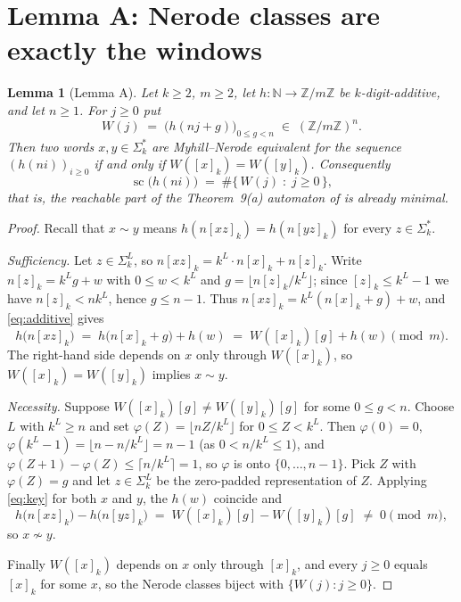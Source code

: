 \documentclass[10pt,reqno]{amsart}
\theoremstyle{plain}
\newtheorem{lemma}[theorem]{Lemma}
\theoremstyle{definition}
\theoremstyle{remark}
\numberwithin{theorem}{section}
\DeclareMathOperator{\sco}{sc}
\newcommand{\Zm}{\mathbb{Z}/m\mathbb{Z}}
\newcommand{\N}{\mathbb{N}}
\newcommand{\Sig}{\Sigma_k}
\begin{document}
\section{Lemma A: Nerode classes are exactly the windows}
\label{sec:lemA}

\begin{lemma}[Lemma A]
\label{lemA}
Let $k \ge 2$, $m \ge 2$, let $h : \N \to \Zm$ be $k$-digit-additive, and let $n \ge 1$.
For $j \ge 0$ put
\[
  W(j) \;=\; \bigl(h(nj + g)\bigr)_{0 \le g < n} \;\in\; (\Zm)^n .
\]
Then two words $x,y \in \Sig^*$ are Myhill--Nerode equivalent for the sequence
$(h(ni))_{i \ge 0}$ if and only if $W([x]_k) = W([y]_k)$. Consequently
\[
  \sco\bigl(h(ni)\bigr) \;=\; \#\{\,W(j) \;:\; j \ge 0\,\},
\]
that is, the reachable part of the Theorem~9(a) automaton of \cite{MRS} is already minimal.
\end{lemma}

\begin{proof}
Recall that $x \sim y$ means $h(n[xz]_k) = h(n[yz]_k)$ for every $z \in \Sig^*$.

\emph{Sufficiency.} Let $z \in \Sig^L$, so $n[xz]_k = k^L \cdot n[x]_k + n[z]_k$. Write
$n[z]_k = k^L g + w$ with $0 \le w < k^L$ and $g = \lfloor n[z]_k / k^L \rfloor$; since
$[z]_k \le k^L - 1$ we have $n[z]_k < nk^L$, hence $g \le n-1$. Thus
$n[xz]_k = k^L(n[x]_k + g) + w$, and \eqref{eq:additive} gives
\begin{equation}
  h\bigl(n[xz]_k\bigr) \;=\; h\bigl(n[x]_k + g\bigr) + h(w)
  \;=\; W([x]_k)[g] + h(w) \pmod m .
  \label{eq:key}
\end{equation}
The right-hand side depends on $x$ only through $W([x]_k)$, so $W([x]_k) = W([y]_k)$
implies $x \sim y$.

\emph{Necessity.} Suppose $W([x]_k)[g] \ne W([y]_k)[g]$ for some $0 \le g < n$. Choose $L$
with $k^L \ge n$ and set $\varphi(Z) = \lfloor nZ/k^L \rfloor$ for $0 \le Z < k^L$. Then
$\varphi(0) = 0$, $\varphi(k^L-1) = \lfloor n - n/k^L \rfloor = n-1$ (as $0 < n/k^L \le 1$),
and $\varphi(Z+1) - \varphi(Z) \le \lceil n/k^L \rceil = 1$, so $\varphi$ is onto
$\{0,\dots,n-1\}$. Pick $Z$ with $\varphi(Z) = g$ and let $z \in \Sig^L$ be the zero-padded
representation of $Z$. Applying \eqref{eq:key} for both $x$ and $y$, the $h(w)$ coincide and
\[
  h\bigl(n[xz]_k\bigr) - h\bigl(n[yz]_k\bigr) \;=\; W([x]_k)[g] - W([y]_k)[g] \;\ne\; 0
  \pmod m ,
\]
so $x \not\sim y$.

Finally $W([x]_k)$ depends on $x$ only through $[x]_k$, and every $j \ge 0$ equals $[x]_k$
for some $x$, so the Nerode classes biject with $\{W(j) : j \ge 0\}$.
\end{proof}
\end{document}

